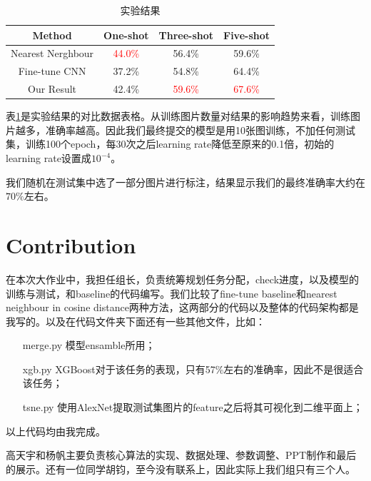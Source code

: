 \documentclass[a4paper]{article}
\begin{document}
\begin{table}
\begin{center}
\begin{tabular}{c|ccc}
	Method & One-shot & Three-shot & Five-shot\\
	\hline
	Nearest Nerghbour & \textcolor{red}{44.0\%} & 56.4\% & 59.6\%\\
	Fine-tune CNN & 37.2\% & 54.8\% & 64.4\% \\
	Our Result & 42.4\% & \textcolor{red}{59.6\%} & \textcolor{red}{67.6\%}
\end{tabular}
\end{center}
\caption{实验结果}
\label{result}
\end{table}

表\ref{result}是实验结果的对比数据表格。从训练图片数量对结果的影响趋势来看，训练图片越多，准确率越高。因此我们最终提交的模型是用10张图训练，不加任何测试集，训练100个epoch，每30次之后learning rate降低至原来的0.1倍，初始的learning rate设置成$10^{-4}$。

我们随机在测试集中选了一部分图片进行标注，结果显示我们的最终准确率大约在$70\%$左右。

\section{Contribution}
在本次大作业中，我担任组长，负责统筹规划任务分配，check进度，以及模型的训练与测试，和baseline的代码编写。我们比较了fine-tune baseline和nearest neighbour in cosine distance两种方法，这两部分的代码以及整体的代码架构都是我写的。以及在代码文件夹下面还有一些其他文件，比如：
\begin{itemize}
	\item[merge.py] 模型ensamble所用；
	\item[xgb.py] XGBoost\cite{xgboost}对于该任务的表现，只有57\%左右的准确率，因此不是很适合该任务；
	\item[tsne.py] 使用AlexNet提取测试集图片的feature之后将其可视化到二维平面上；
\end{itemize}
以上代码均由我完成。

高天宇和杨帆主要负责核心算法的实现、数据处理、参数调整、PPT制作和最后的展示。还有一位同学胡钧，至今没有联系上，因此实际上我们组只有三个人。
{}

\end{document}
